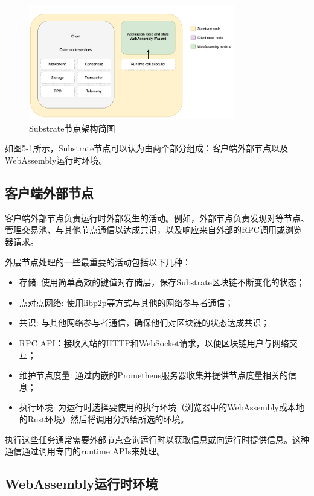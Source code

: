\begin{figure}[htbp]
    \centering
    \includegraphics[width=0.8\textwidth]{images/simplified-architecture.png}
    \caption{Substrate节点架构简图}\label{Substrate节点架构简图} %
\end{figure}

如图5-1所示，Substrate节点可以认为由两个部分组成：客户端外部节点以及WebAssembly运行时环境。

\subsection{客户端外部节点}

客户端外部节点负责运行时外部发生的活动。例如，外部节点负责发现对等节点、管理交易池、与其他节点通信以达成共识，以及响应来自外部的RPC调用或浏览器请求。

外层节点处理的一些最重要的活动包括以下几种：

\begin{itemize}
    \item 存储: 使用简单高效的键值对存储层，保存Substrate区块链不断变化的状态；
    \item 点对点网络: 使用libp2p等方式与其他的网络参与者通信；
    \item 共识: 与其他网络参与者通信，确保他们对区块链的状态达成共识；
    \item RPC API：接收入站的HTTP和WebSocket请求，以便区块链用户与网络交互；
    \item 维护节点度量: 通过内嵌的Prometheus服务器收集并提供节点度量相关的信息；
    \item 执行环境: 为运行时选择要使用的执行环境（浏览器中的WebAssembly或本地的Rust环境）然后将调用分派给所选的环境。
\end{itemize}

执行这些任务通常需要外部节点查询运行时以获取信息或向运行时提供信息。这种通信通过调用专门的runtime APIs来处理。

\subsection{WebAssembly运行时环境}

